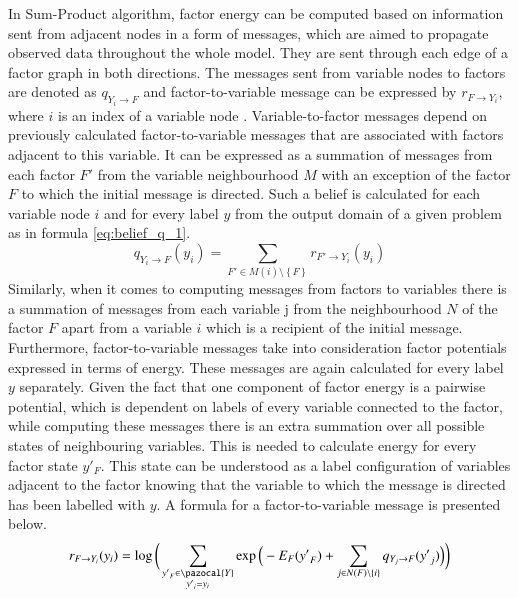 In Sum-Product algorithm, factor energy can be computed based on information sent from adjacent nodes in a form of messages, which are aimed to propagate observed data throughout the whole model. They are sent through each edge of a factor graph in both directions. The messages sent from variable nodes to factors are denoted as $q_{Y_i\rightarrow F}$ and factor-to-variable message can be expressed by $r_{F\rightarrow Y_i}$, where $i$ is an index of a variable node \cite{Nowozin}. Variable-to-factor messages depend on previously calculated factor-to-variable messages that are associated with factors adjacent to this variable. It can be expressed as a summation of messages from each factor $F'$ from the variable neighbourhood $M$ with an exception of the factor $F$ to which the initial message is directed. Such a belief is calculated for each variable node $i$ and for every label $y$ from the output domain of a given problem as in formula \ref{eq:belief_q_1}.
\begin{equation}
    \label{eq:belief_q_1}
    q_{Y_i\rightarrow F}(y_i)=\sum_{F' \in M(i) \setminus \left \{ F \right \} }{ r_{F'\rightarrow Y_i}(y_i)}
\end{equation}
Similarly, when it comes to computing messages from factors to variables there is a summation of messages from each variable j from the neighbourhood $N$ of the factor $F$ apart from a variable $i$ which is a recipient of the initial message. Furthermore, factor-to-variable messages take into consideration factor potentials expressed in terms of energy. These messages are again calculated for every label $y$ separately. Given the fact that one component of factor energy is a pairwise potential, which is dependent on labels of every variable connected to the factor, while computing these messages there is an extra summation over all possible states of neighbouring variables. This is needed to calculate energy for every factor state $y'_F$. This state can be understood as a label configuration of variables adjacent to the factor knowing that the variable to which the message is directed has been labelled with $y$. A formula for a factor-to-variable message is presented below. 
\begin{equation}
    r_{F\rightarrow Y_i}(y_i) = \log{\bigg(
        \sum_{\substack{{y'}_{F}\in \pazocal{Y}                              \\ {y'}_i = y_i}}
        \exp{\Big(-{E_F}({y'}_F) +
        \sum_{j \in N (F) \setminus \left \{ i \right \}}
            {q_{Y_j\rightarrow F}({y'}_j)}
    \Big)} \bigg)}
\end{equation}

